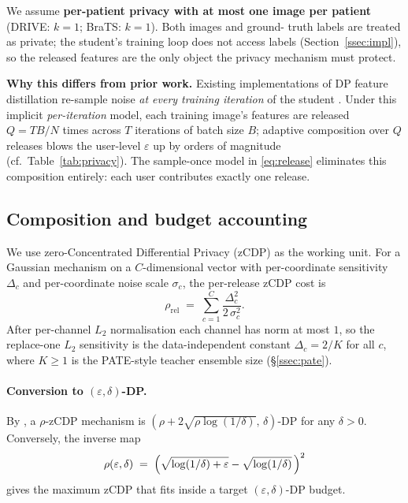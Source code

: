 We assume \textbf{per-patient privacy with at most one image per
patient} (DRIVE: $k\!=\!1$; BraTS: $k\!=\!1$). Both images and ground-
truth labels are treated as private; the student's training loop does
not access labels (Section~\ref{ssec:impl}), so the released features
are the only object the privacy mechanism must protect.

\textbf{Why this differs from prior work.}
Existing implementations of DP feature distillation re-sample noise
\emph{at every training iteration} of the student
\cite{lan2024gkd,Anonymous_anonymous}. Under this implicit
\emph{per-iteration} model, each training image's features are
released $Q = TB/N$ times across $T$ iterations of batch size $B$;
adaptive composition over $Q$ releases blows the user-level $\varepsilon$
up by orders of magnitude (cf.\ Table~\ref{tab:privacy}). The
sample-once model in \eqref{eq:release} eliminates this composition
entirely: each user contributes exactly one release.

\subsection{Composition and budget accounting}
\label{ssec:accounting}

We use zero-Concentrated Differential Privacy (zCDP)
\cite{bun2016concentrated} as the working unit. For a Gaussian
mechanism on a $C$-dimensional vector with per-coordinate sensitivity
$\Delta_c$ and per-coordinate noise scale $\sigma_c$, the per-release
zCDP cost is
\begin{equation}
\rho_{\mathrm{rel}}
 \;=\; \sum_{c=1}^{C}\frac{\Delta_c^2}{2\,\sigma_c^2}.
\label{eq:rho-rel}
\end{equation}
After per-channel $L_2$ normalisation each channel has norm at most
$1$, so the replace-one $L_2$ sensitivity is the data-independent
constant $\Delta_c = 2/K$ for all $c$, where $K\geq 1$ is the
PATE-style teacher ensemble size (\S\ref{ssec:pate}).

\paragraph{Conversion to $(\varepsilon,\delta)$-DP.}
By \cite[Prop.~1.3]{bun2016concentrated}, a $\rho$-zCDP mechanism is
$(\rho + 2\sqrt{\rho\log(1/\delta)},\,\delta)$-DP for any $\delta>0$.
Conversely, the inverse map
\begin{equation}
\rho(\varepsilon,\delta)
 \;=\;\Bigl(\sqrt{\log(1/\delta)+\varepsilon}-\sqrt{\log(1/\delta)}\,\Bigr)^{2}
\label{eq:eps-to-rho}
\end{equation}
gives the maximum zCDP that fits inside a target
$(\varepsilon,\delta)$-DP budget.

